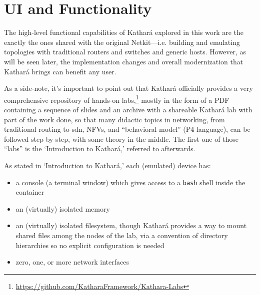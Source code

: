 \section{UI and Functionality}
\label{sec:katharafunctionality}


The high-level functional capabilities of Kathará explored in this work are the exactly the ones shared with the original Netkit---i.e. building and emulating topologies with traditional routers and switches and generic hosts.
However, as will be seen later, the implementation changes and overall modernization that Kathará brings can benefit any user.

As a side-note, it's important to point out that Kathará officially provides a very comprehensive repository of hands-on labs,\footnote{\mbox{\url{https://github.com/KatharaFramework/Kathara-Labs}}} mostly in the form of a PDF containing a sequence of slides and an archive with a shareable Kathará lab with part of the work done, so that many didactic topics in networking, from traditional routing to \gls{sdn}, NFVs, and ``behavioral model'' (P4 language), can be followed step-by-step, with some theory in the middle.
The first one of those ``labs'' is the `Introduction to Kathará,' referred to afterwards.



As stated in `Introduction to Kathará,' each (emulated) device has:
\begin{itemize}
  \item a console (a terminal window) which gives access to a \texttt{bash} shell inside the container
  \item an (virtually) isolated memory
  \item an (virtually) isolated filesystem, though Kathará provides a way to mount shared files among the nodes of the lab, via a convention of directory hierarchies so no explicit configuration is needed
  \item zero, one, or more network interfaces
\end{itemize}

